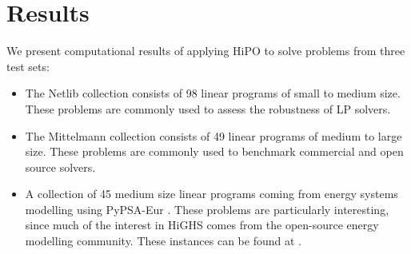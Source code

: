 \documentclass[a4paper]{article}
\newcommand{\0}{\mathbf 0}
\begin{document}



\section{Results}
\label{sec:results}

We present computational results of applying HiPO to solve problems from three test sets: 
\begin{itemize}
\item The Netlib collection \cite{netlib} consists of 98 linear programs of small to medium size. These problems are commonly used to assess the robustness of LP solvers.
\item The Mittelmann collection \cite{mittelmann} consists of 49 linear programs of medium to large size. These problems are commonly used to benchmark commercial and open source solvers.
\item A collection of 45 medium size linear programs coming from energy systems modelling using PyPSA-Eur \cite{HorHofSchBro:pypsa}. These problems are particularly interesting, since much of the interest in HiGHS comes from the open-source energy modelling community. These instances can be found at \cite{openenergy}.
\end{itemize}
\end{document}
